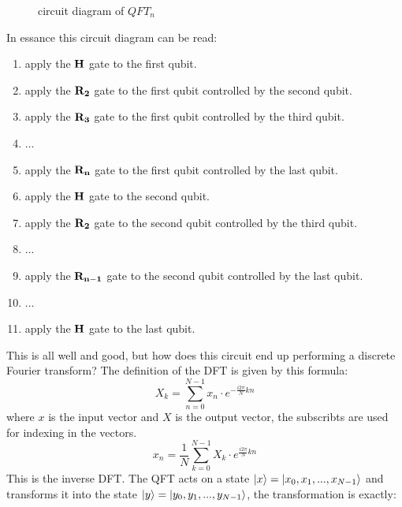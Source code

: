 \begin{figure}[H]
{
    }
    \caption{circuit diagram of $QFT_n$}
    \label{fig:QTF_n}
\end{figure}
In essance this circuit diagram can be read:
\begin{enumerate}
    \item apply the $\mathbf{H}$ gate to the first qubit. 
    \item apply the $\mathbf{R_{2}}$ gate to the first qubit controlled by the second qubit. 
    \item apply the $\mathbf{R_{3}}$ gate to the first qubit controlled by the third qubit. 
    \item ... 
    \item apply the $\mathbf{R_{n}}$ gate to the first qubit controlled by the last qubit. 
    \item apply the $\mathbf{H}$ gate to the second qubit. 
    \item apply the $\mathbf{R_{2}}$ gate to the second qubit controlled by the third qubit. 
    \item ... 
    \item apply the $\mathbf{R_{n-1}}$ gate to the second qubit controlled by the last qubit. 
    \item ... 
    \item apply the $\mathbf{H}$ gate to the last qubit. 
\end{enumerate}
This is all well and good, but how does this circuit end up performing a discrete Fourier transform? The definition of the DFT is given by this formula:
$$X_{k}=\sum _{n=0}^{N-1}x_{n}\cdot e^{-{\frac {i2\pi }{N}}kn}$$
where $x$ is the input vector and $X$ is the output vector, the subscribts are used for indexing in the vectors. 
$$x_{n}={\frac {1}{N}}\sum _{k=0}^{N-1}X_{k}\cdot e^{{\frac {i2\pi }{N}}kn}$$
This is the inverse DFT.
The QFT acts on a state $\ket{x}=\ket{x_0,x_1,...,x_{N-1}}$ and transforms it into the state $\ket{y}=\ket{y_0,y_1,...,y_{N-1}}$, the transformation is exactly: 
